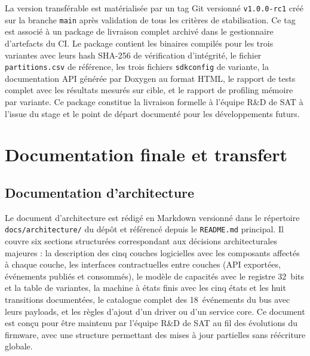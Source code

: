 La version transférable est matérialisée par un tag Git versionné
\texttt{v1.0.0-rc1} créé sur la branche \texttt{main} après validation
de tous les critères de stabilisation. Ce tag est associé à un package
de livraison complet archivé dans le gestionnaire d'artefacts du CI.
Le package contient les binaires compilés pour les trois variantes
avec leurs hash SHA-256 de vérification d'intégrité, le fichier
\texttt{partitions.csv} de référence, les trois fichiers
\texttt{sdkconfig} de variante, la documentation API générée par
Doxygen au format HTML, le rapport de tests complet avec les résultats
mesurés sur cible, et le rapport de profiling mémoire par variante.
Ce package constitue la livraison formelle à l'équipe R\&D de SAT
à l'issue du stage et le point de départ documenté pour les
développements futurs.

\section{Documentation finale et transfert}
\label{sec:docs}

\subsection{Documentation d'architecture}
\label{subsec:doc_archi}

Le document d'architecture est rédigé en Markdown versionné dans
le répertoire \texttt{docs/architecture/} du dépôt et référencé
depuis le \texttt{README.md} principal. Il couvre six sections
structurées correspondant aux décisions architecturales majeures :
la description des cinq couches logicielles avec les composants
affectés à chaque couche, les interfaces contractuelles entre couches
(API exportées, événements publiés et consommés), le modèle de
capacités avec le registre 32~bits et la table de variantes, la
machine à états finis avec les cinq états et les huit transitions
documentées, le catalogue complet des 18~événements du bus avec
leurs payloads, et les règles d'ajout d'un driver ou d'un service
core. Ce document est conçu pour être maintenu par l'équipe R\&D de
SAT au fil des évolutions du firmware, avec une structure permettant
des mises à jour partielles sans réécriture globale.

